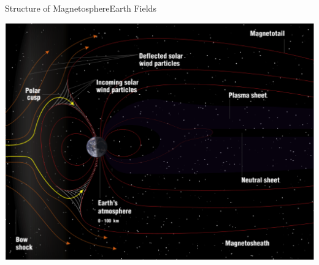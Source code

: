 \documentclass{beamer}
\begin{document}


%
%  



\begin{frame}{Structure of Magnetosphere}{Earth Fields}
	\begin{center}
		\includegraphics[height=0.85 \textheight]{magsphere.png}
	\end{center}
\end{frame}
\end{document}
